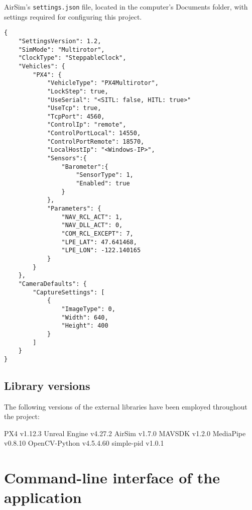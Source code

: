 \begin{listing}[h]
    \caption{AirSim's \texttt{settings.json} file, located in the computer's Documents folder, with settings required for configuring this project.}
    \label{lst:airsim-settings}
    \begin{verbatim}
{
    "SettingsVersion": 1.2,
    "SimMode": "Multirotor",
    "ClockType": "SteppableClock",
    "Vehicles": {
        "PX4": {
            "VehicleType": "PX4Multirotor",
            "LockStep": true,
            "UseSerial": "<SITL: false, HITL: true>"
            "UseTcp": true,
            "TcpPort": 4560,
            "ControlIp": "remote",
            "ControlPortLocal": 14550,
            "ControlPortRemote": 18570,
            "LocalHostIp": "<Windows-IP>",
            "Sensors":{
                "Barometer":{
                    "SensorType": 1,
                    "Enabled": true
                }
            },
            "Parameters": {
                "NAV_RCL_ACT": 1,
                "NAV_DLL_ACT": 0,
                "COM_RCL_EXCEPT": 7,
                "LPE_LAT": 47.641468,
                "LPE_LON": -122.140165
            }
        }
    },
    "CameraDefaults": {
        "CaptureSettings": [
            {
                "ImageType": 0,
                "Width": 640,
                "Height": 400
            }
        ]
    }
}
    \end{verbatim}
\end{listing}

\section{Library versions}

The following versions of the external libraries have been employed throughout the project:

PX4 v1.12.3
Unreal Engine v4.27.2
AirSim v1.7.0
MAVSDK v1.2.0
MediaPipe v0.8.10
OpenCV-Python v4.5.4.60
simple-pid v1.0.1


\chapter{Command-line interface of the application}
\label{app:cli}

